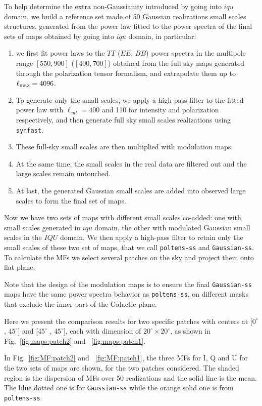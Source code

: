 \documentclass[twocolumn]{aastex631}
\begin{document}
To help determine the extra non-Gaussianity introduced by going into $iqu$ domain, we build a reference set made of 50 Gaussian realizations small scales structures, generated from the power law fitted to the power spectra of the final sets of maps obtained by going into $iqu$ domain, in particular:

\begin{enumerate}

\item we first fit power laws to the $TT$ ($EE$, $BB$) power spectra in the multipole range $[550, 900]$ ($[400, 700]$) obtained from the full sky maps generated through the polarization tensor formalism, and extrapolate them up to $\ell_{\rm max}=4096$. 
\item To generate only the small scales, we apply a high-pass filter to the fitted power law with $\ell_{cut} = 400$ and 110 for intensity and polarization respectively, and then generate full sky small scales realizations using \texttt{synfast}. 
\item These full-sky small scales are then multiplied with modulation maps. 
\item At the same time, the small scales in the real data are filtered out and the large scales remain untouched.
\item At last, the generated Gaussian small scales are added into observed large scales to form the final set of maps. 
\end{enumerate}

Now we have two sets of maps with different small scales co-added: one with small scales generated in $iqu$ domain, the other with modulated Gaussian small scales in the $IQU$ domain. We then apply a high-pass filter to retain only the small scales of these two set of maps, that we call \texttt{poltens-ss} and \texttt{Gaussian-ss}. To calculate the MFs we select several patches on the sky and project them onto flat plane.

Note that the design of the modulation maps is to ensure the final \texttt{Gaussian-ss} maps  have the same power spectra behavior as \texttt{poltens-ss}, on different masks that exclude the inner part of the Galactic plane. 

Here we present the comparison results for two specific patches with centers at [$0^{\circ}$ , $45^{\circ} $] and [$45^{\circ}$ , $45^{\circ} $], each with dimension of $20^{\circ}\times20^{\circ}$,  as shown in Fig.~\ref{fig:maps:patch2} and ~\ref{fig:maps:patch1}.

In Fig.~\ref{fig:MF:patch2} and ~\ref{fig:MF:patch1}, the three MFs for I, Q and U for the two sets of maps are shown, for the two patches considered. The shaded region is the dispersion of MFs over 50 realizations and the solid line is the mean. The blue dotted one is for \texttt{Gaussian-ss} while the orange solid one is from \texttt{poltens-ss}.
\end{document}
